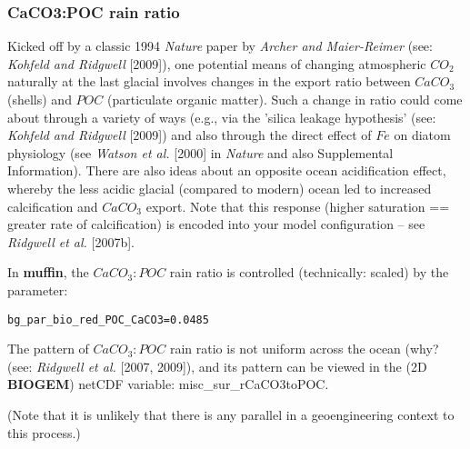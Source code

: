 
\subsubsection*{CaCO3:POC rain ratio}

\vspace{2mm}
Kicked off by a classic 1994 \textit{Nature} paper by \textit{Archer and Maier-Reimer} (see: \textit{Kohfeld and Ridgwell} [2009]), one potential means of changing atmospheric \(CO_{2}\) naturally at the last glacial involves changes in the export ratio between \(CaCO_{3}\) (shells) and \(POC\) (particulate organic matter). Such a change in ratio could come about through a variety of ways (e.g., via the 'silica leakage hypothesis' (see: \textit{Kohfeld and Ridgwell} [2009]) and also through the direct effect of \(Fe\) on diatom physiology (see \textit{Watson et al.} [2000] in \textit{Nature} and also Supplemental Information). There are also ideas about an opposite ocean acidification effect, whereby the less acidic glacial (compared to modern) ocean led to increased calcification and \(CaCO_{3}\) export. Note that this response (higher saturation == greater rate of calcification) is encoded into your model configuration – see \textit{Ridgwell et al.} [2007b].

\vspace{1mm}
In \textbf{muffin}, the \(CaCO_{3}:POC\) rain ratio is controlled (technically: scaled) by the parameter:
\vspace{-1mm}\small\begin{verbatim}
bg_par_bio_red_POC_CaCO3=0.0485
\end{verbatim}\normalsize\vspace{-1mm}

The pattern of \(CaCO_{3}:POC\) rain ratio is not uniform across the ocean (why? (see: \textit{Ridgwell et al.} [2007, 2009]), and its pattern can be viewed in the (2D \textbf{BIOGEM}) netCDF variable: \textsf{\footnotesize misc\_sur\_rCaCO3toPOC}.

(Note that it is unlikely that there is any parallel in a geoengineering context to this process.)

